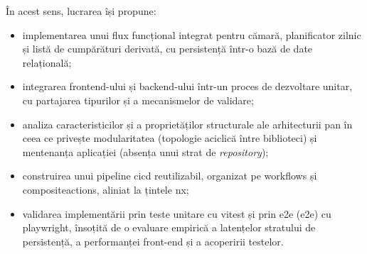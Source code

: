 În acest sens, lucrarea își propune:
\begin{itemize}
  \item implementarea unui flux funcțional integrat pentru cămară, planificator zilnic și listă de cumpărături derivată, cu persistență într-o bază de date relațională;
  \item integrarea frontend-ului și backend-ului într-un proces de dezvoltare unitar, cu partajarea tipurilor și a mecanismelor de validare;
  \item analiza caracteristicilor și a proprietăților structurale ale arhitecturii \gls{pan} în ceea ce privește modularitatea (topologie aciclică între biblioteci) și mentenanța aplicației (absența unui strat de \textit{repository});
  \item construirea unui pipeline \acrshort{cicd} reutilizabil, organizat pe \glspl{workflow} și \glspl{compositeaction}, aliniat la țintele \gls{nx};
  \item validarea implementării prin teste unitare cu \gls{vitest} și prin \acrlong{e2e} (\acrshort{e2e}) cu \gls{playwright}, însoțită de o evaluare empirică a latențelor stratului de persistență, a performanței front-end și a acoperirii testelor.
\end{itemize}

